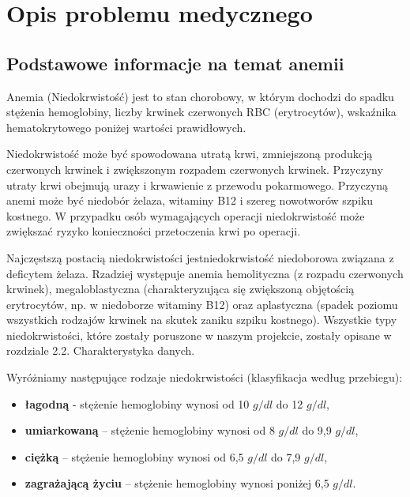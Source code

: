 \documentclass[runningheads]{llncs}
\begin{document}
\newpage

\section {Opis problemu medycznego}

\subsection{Podstawowe informacje na temat anemii}

Anemia (Niedokrwistość) jest to stan chorobowy, w którym dochodzi do spadku stężenia
hemoglobiny, liczby krwinek czerwonych RBC (erytrocytów), wskaźnika hematokrytowego
poniżej wartości prawidłowych. 

Niedokrwistość może być spowodowana utratą krwi, zmniejszoną produkcją czerwonych krwinek i zwiększonym rozpadem czerwonych krwinek. Przyczyny utraty krwi obejmują urazy i krwawienie z przewodu pokarmowego. Przyczyną anemi może być niedobór żelaza, witaminy B12 i szereg nowotworów szpiku kostnego. W przypadku osób wymagających operacji niedokrwistość może zwiększać ryzyko konieczności przetoczenia krwi po operacji.

Najczęstszą postacią niedokrwistości jestniedokrwistość niedoborowa związana z deficytem żelaza. Rzadziej występuje anemia hemolityczna (z rozpadu czerwonych krwinek), megaloblastyczna (charakteryzująca się zwiększoną objętością erytrocytów, np. w niedoborze witaminy B12) oraz aplastyczna (spadek poziomu wszystkich rodzajów krwinek na skutek zaniku szpiku kostnego). Wszystkie typy niedokrwistości, które zostały poruszone w naszym projekcie, zostały opisane w rozdziale  2.2. Charakterystyka danych.

\vspace{5mm}

Wyróżniamy następujące rodzaje niedokrwistości (klasyfikacja według przebiegu):

\begin{itemize}
    \item \textbf{łagodną} - stężenie hemoglobiny wynosi od 10 \( g/dl\) do 12 \( g/dl\),
    \item \textbf{umiarkowaną} – stężenie hemoglobiny wynosi od 8  \( g/dl\)  do 9,9 \( g/dl\),
    \item \textbf{ciężką} – stężenie hemoglobiny wynosi od 6,5  \( g/dl\) do 7,9  \( g/dl\),
    \item \textbf{zagrażającą życiu} – stężenie hemoglobiny wynosi poniżej 6,5  \( g/dl\).
\end{itemize}
\end{document}

